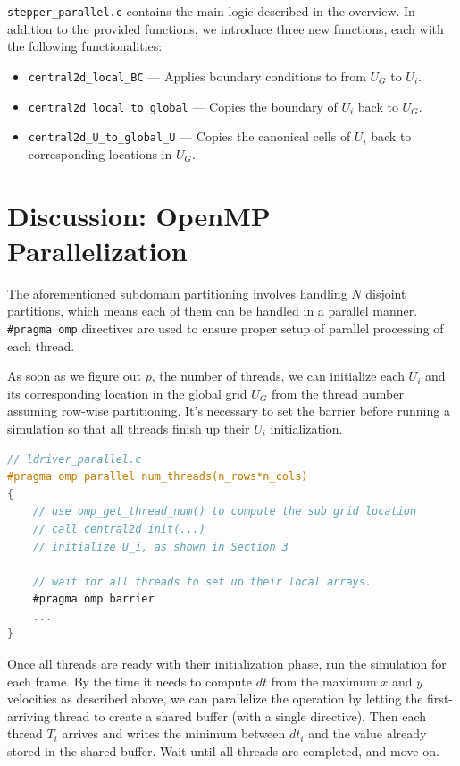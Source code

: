 \documentclass{article}
\begin{document}
\texttt{stepper\_parallel.c} contains the main logic described in the overview. In addition to the provided functions, we introduce three new functions, each with the following functionalities:

\begin{itemize}
	\item \texttt{central2d\_local\_BC} --- Applies boundary conditions to from $U_G$ to $U_i$.
	\item \texttt{central2d\_local\_to\_global} --- Copies the boundary of $U_i$ back to $U_G$.
	\item \texttt{central2d\_U\_to\_global\_U} --- Copies the canonical cells of $U_i$ back to corresponding locations in $U_G$.
\end{itemize}

\section{Discussion: OpenMP Parallelization}

The aforementioned subdomain partitioning involves handling $N$ disjoint partitions, which means each of them can be handled in a parallel manner. \texttt{\#pragma omp} directives are used to ensure proper setup of parallel processing of each thread.

As soon as we figure out $p$, the number of threads, we can initialize each $U_i$ and its corresponding location in the global grid $U_G$ from the thread number assuming row-wise partitioning. It's necessary to set the barrier before running a simulation so that all threads finish up their $U_i$ initialization.

\begin{lstlisting}[language=C]
// ldriver_parallel.c
#pragma omp parallel num_threads(n_rows*n_cols)
{
    // use omp_get_thread_num() to compute the sub grid location
    // call central2d_init(...)
    // initialize U_i, as shown in Section 3

    // wait for all threads to set up their local arrays.
    #pragma omp barrier
    ...
}
\end{lstlisting}

Once all threads are ready with their initialization phase, run the simulation for each frame. By the time it needs to compute $dt$ from the maximum $x$ and $y$ velocities as described above, we can parallelize the operation by letting the first-arriving thread to create a shared buffer (with a single directive). Then each thread $T_i$ arrives and writes the minimum between $dt_i$ and the value already stored in the shared buffer. Wait until all threads are completed, and move on.
\end{document}
